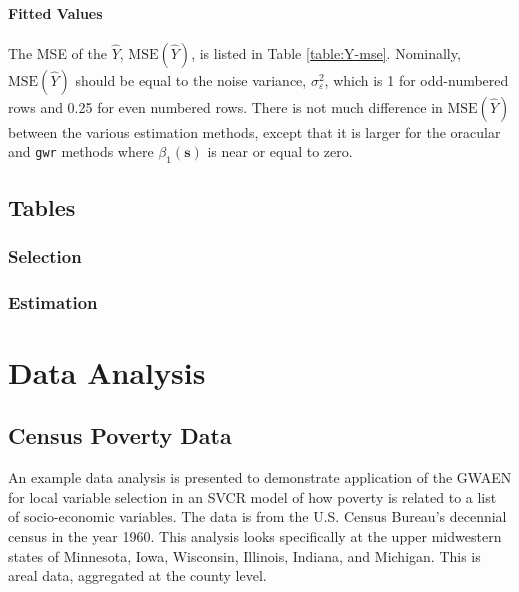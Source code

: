 \documentclass[authoryear, review, 11pt]{elsarticle}
\begin{document}
	\paragraph{Fitted Values} The MSE of the $\hat{Y}$, $\text{MSE}\left(\hat{Y}\right)$, is listed in Table \ref{table:Y-mse}. Nominally, $\text{MSE}\left(\hat{Y}\right)$ should be equal to the noise variance, $\sigma_{\varepsilon}^2$, which is 1 for odd-numbered rows and 0.25 for even numbered rows. There is not much difference in $\text{MSE}\left(\hat{Y}\right)$ between the various estimation methods, except that it is larger for the oracular and \verb!gwr! methods where $\beta_1(\bm{s})$ is near or equal to zero.
	
	\subsection{Tables}
		\subsubsection{Selection}
			

		\subsubsection{Estimation}
			
			
						
			

			
\section{Data Analysis\label{section:data-analysis}}
	\subsection{Census Poverty Data}
	An example data analysis is presented to demonstrate application of the GWAEN for local variable selection in an SVCR model of how poverty is related to a list of socio-economic variables. The data is from the U.S. Census Bureau's decennial census in the year 1960. This analysis looks specifically at the upper midwestern states of Minnesota, Iowa, Wisconsin, Illinois, Indiana, and Michigan. This is areal data, aggregated at the county level.
	
\end{document}
